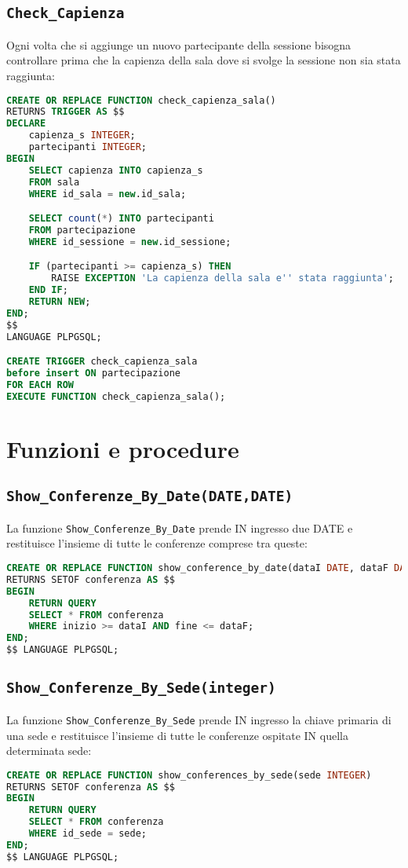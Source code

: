 \subsection{\texttt{Check\_Capienza}}
Ogni volta che si aggiunge un nuovo partecipante della sessione bisogna controllare prima che la capienza della sala dove si svolge la sessione non sia stata raggiunta:
\begin{lstlisting}[language=SQL, style=mystyle]
CREATE OR REPLACE FUNCTION check_capienza_sala() 
RETURNS TRIGGER AS $$
DECLARE
	capienza_s INTEGER;
	partecipanti INTEGER;
BEGIN
	SELECT capienza INTO capienza_s
	FROM sala
	WHERE id_sala = new.id_sala;

	SELECT count(*) INTO partecipanti
	FROM partecipazione
	WHERE id_sessione = new.id_sessione;

	IF (partecipanti >= capienza_s) THEN
		RAISE EXCEPTION 'La capienza della sala e'' stata raggiunta';
	END IF;
	RETURN NEW;
END;
$$ 
LANGUAGE PLPGSQL;

CREATE TRIGGER check_capienza_sala
before insert ON partecipazione
FOR EACH ROW
EXECUTE FUNCTION check_capienza_sala();
\end{lstlisting}
\section{Funzioni e procedure}
\subsection{\texttt{Show\_Conferenze\_By\_Date(DATE,DATE)}}
La funzione \texttt{Show\_Conferenze\_By\_Date} prende IN ingresso due DATE e restituisce l'insieme di tutte le conferenze comprese tra queste:
\begin{lstlisting}[language=SQL, style=mystyle]
CREATE OR REPLACE FUNCTION show_conference_by_date(dataI DATE, dataF DATE)
RETURNS SETOF conferenza AS $$
BEGIN
	RETURN QUERY
	SELECT * FROM conferenza
	WHERE inizio >= dataI AND fine <= dataF;
END;
$$ LANGUAGE PLPGSQL;
\end{lstlisting}
\subsection{\texttt{Show\_Conferenze\_By\_Sede(integer)}}
La funzione \texttt{Show\_Conferenze\_By\_Sede} prende IN ingresso la chiave primaria di una sede e restituisce l'insieme di tutte le conferenze ospitate IN quella determinata sede:
\begin{lstlisting}[language=SQL, style=mystyle]
CREATE OR REPLACE FUNCTION show_conferences_by_sede(sede INTEGER)
RETURNS SETOF conferenza AS $$
BEGIN
	RETURN QUERY
	SELECT * FROM conferenza
	WHERE id_sede = sede;
END;
$$ LANGUAGE PLPGSQL;
\end{lstlisting}
